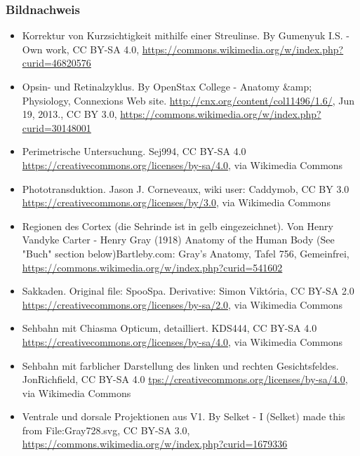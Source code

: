 \documentclass{beamer}
\begin{document}
 
\begin{frame}
\frametitle{Bildnachweis}
\begin{tiny}



 
\begin{itemize}

  
\item
Korrektur von Kurzsichtigkeit mithilfe einer Streulinse. By Gumenyuk I.S. - Own work, CC BY-SA 4.0, \url{https://commons.wikimedia.org/w/index.php?curid=46820576}


\item
Opsin- und Retinalzyklus. By OpenStax College - Anatomy &amp; Physiology, Connexions Web site. \url{http://cnx.org/content/col11496/1.6/}, Jun 19, 2013., CC BY 3.0, \url{https://commons.wikimedia.org/w/index.php?curid=30148001}

\item
Perimetrische Untersuchung. Sej994, CC BY-SA 4.0 \url{https://creativecommons.org/licenses/by-sa/4.0}, via Wikimedia Commons


\item
Phototransduktion. Jason J. Corneveaux, wiki user: Caddymob, CC BY 3.0 \url{https://creativecommons.org/licenses/by/3.0}, via Wikimedia Commons

\item
Regionen des Cortex (die Sehrinde ist in gelb eingezeichnet). Von Henry Vandyke Carter - Henry Gray (1918) Anatomy of the Human Body (See "Buch" section below)Bartleby.com: Gray's Anatomy, Tafel 756, Gemeinfrei, \url{https://commons.wikimedia.org/w/index.php?curid=541602}

\item
Sakkaden. Original file: SpooSpa. Derivative: Simon Viktória, CC BY-SA 2.0 \url{https://creativecommons.org/licenses/by-sa/2.0}, via Wikimedia Commons

\item
Sehbahn mit Chiasma Opticum, detailliert. KDS444, CC BY-SA 4.0 \url{https://creativecommons.org/licenses/by-sa/4.0}, via Wikimedia Commons

\item
Sehbahn mit farblicher Darstellung des linken und rechten Gesichtsfeldes. JonRichfield, CC BY-SA 4.0 \url{tps://creativecommons.org/licenses/by-sa/4.0}, via Wikimedia Commons

\item
Ventrale und dorsale Projektionen aus V1. By Selket - I (Selket) made this from File:Gray728.svg, CC BY-SA 3.0, \url{https://commons.wikimedia.org/w/index.php?curid=1679336}


\end{itemize}
\end{tiny}
\end{frame}
\end{document}
